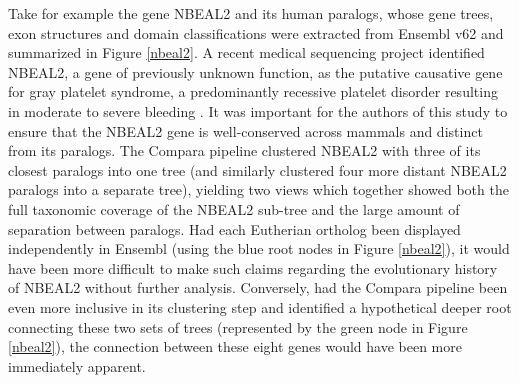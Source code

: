 Take for example the gene NBEAL2 and its human paralogs, whose gene
trees, exon structures and domain classifications were extracted from
Ensembl v62 and summarized in Figure \ref{nbeal2}. A recent medical
sequencing project identified NBEAL2, a gene of previously unknown
function, as the putative causative gene for gray platelet syndrome, a
predominantly recessive platelet disorder resulting in moderate to
severe bleeding \citep{Albers2011Exome}. It was important for the
authors of this study to ensure that the NBEAL2 gene is well-conserved
across mammals and distinct from its paralogs. The Compara pipeline
clustered NBEAL2 with three of its closest paralogs into one tree (and
similarly clustered four more distant NBEAL2 paralogs into a separate
tree), yielding two views which together showed both the full
taxonomic coverage of the NBEAL2 sub-tree and the large amount of
separation between paralogs. Had each Eutherian ortholog been
displayed independently in Ensembl (using the blue root nodes in
Figure \ref{nbeal2}), it would have been more difficult to make such
claims regarding the evolutionary history of NBEAL2 without further
analysis. Conversely, had the Compara pipeline been even more
inclusive in its clustering step and identified a hypothetical deeper
root connecting these two sets of trees (represented by the green node
in Figure \ref{nbeal2}), the connection between these eight genes
would have been more immediately apparent.

